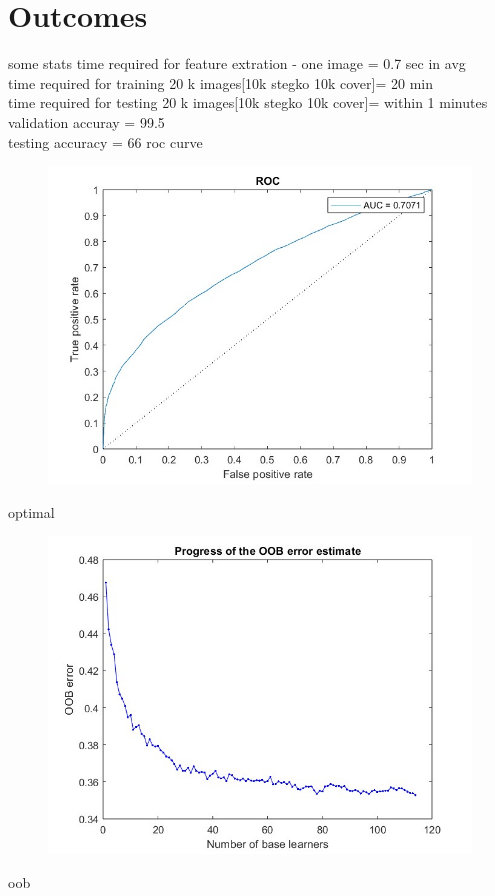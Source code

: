 \chapter{Outcomes}
some stats
time required for feature extration - one image = 0.7 sec in avg\\
time required for training 20 k images[10k stegko 10k cover]= 20 min\\
time required for testing 20 k images[10k stegko 10k cover]= within 1 minutes\\
validation accuray = 99.5\\
testing accuracy = 66%
roc curve
\begin{figure}[H]
    \centering
    \includegraphics[width=120mm]{./img/roc4.jpg}
\end{figure}
optimal 
\begin{figure}[H]
    \centering
    \includegraphics[width=120mm]{./img/optimal4.jpg}
\end{figure}
oob 






